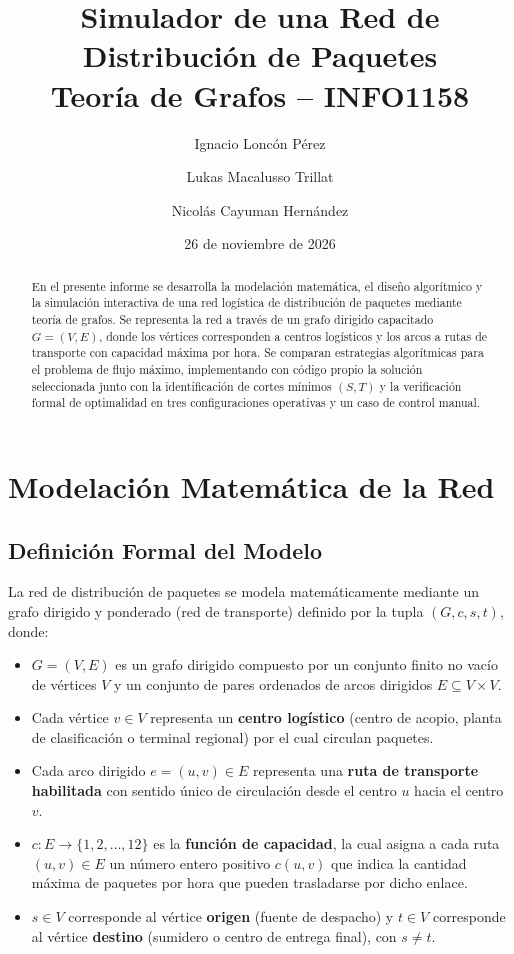 \documentclass[11pt,a4paper]{article}
\title{\textbf{Simulador de una Red de Distribución de Paquetes}\\
\large Teoría de Grafos -- INFO1158}
\author{
    Ignacio Loncón Pérez\and
    Lukas Macalusso Trillat\and 
    Nicolás Cayuman Hernández
}
\date{26 de noviembre de 2026}
\begin{document}
\maketitle

\newpage

\begin{abstract}
En el presente informe se desarrolla la modelación matemática, el diseño algorítmico y la simulación interactiva de una red logística de distribución de paquetes mediante teoría de grafos. Se representa la red a través de un grafo dirigido capacitado $G = (V, E)$, donde los vértices corresponden a centros logísticos y los arcos a rutas de transporte con capacidad máxima por hora. Se comparan estrategias algorítmicas para el problema de flujo máximo, implementando con código propio la solución seleccionada junto con la identificación de cortes mínimos $(S, T)$ y la verificación formal de optimalidad en tres configuraciones operativas y un caso de control manual.
\end{abstract} 

\newpage
\tableofcontents
\newpage

\section{Modelación Matemática de la Red}

\subsection{Definición Formal del Modelo}
La red de distribución de paquetes se modela matemáticamente mediante un grafo dirigido y ponderado (red de transporte) definido por la tupla $(G, c, s, t)$, donde:
\begin{itemize}
    \item $G = (V, E)$ es un grafo dirigido compuesto por un conjunto finito no vacío de vértices $V$ y un conjunto de pares ordenados de arcos dirigidos $E \subseteq V \times V$.
    \item Cada vértice $v \in V$ representa un \textbf{centro logístico} (centro de acopio, planta de clasificación o terminal regional) por el cual circulan paquetes.
    \item Cada arco dirigido $e = (u, v) \in E$ representa una \textbf{ruta de transporte habilitada} con sentido único de circulación desde el centro $u$ hacia el centro $v$.
    \item $c: E \longrightarrow \{1, 2, \dots, 12\}$ es la \textbf{función de capacidad}, la cual asigna a cada ruta $(u, v) \in E$ un número entero positivo $c(u, v)$ que indica la cantidad máxima de paquetes por hora que pueden trasladarse por dicho enlace.
    \item $s \in V$ corresponde al vértice \textbf{origen} (fuente de despacho) y $t \in V$ corresponde al vértice \textbf{destino} (sumidero o centro de entrega final), con $s \neq t$.
\end{itemize}
\end{document}
